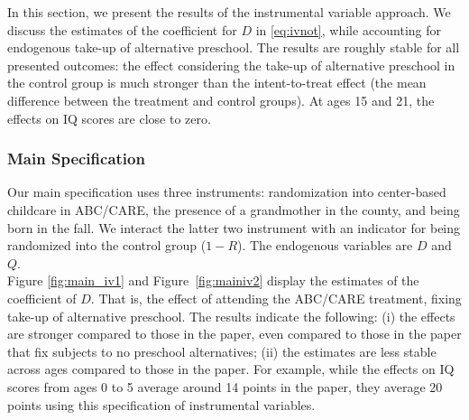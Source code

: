 \noindent In this section, we present the results of the instrumental variable approach. We discuss the estimates of the coefficient for $D$ in \eqref{eq:ivnot}, while accounting for endogenous take-up of alternative preschool. The results are roughly stable for all presented outcomes: the effect considering the take-up of alternative preschool in the control group is much stronger than the intent-to-treat effect (the mean difference between the treatment and control groups). At ages 15 and 21, the effects on IQ scores are close to zero.

\subsubsection{Main Specification}

\noindent Our main specification uses three instruments: randomization into center-based childcare in ABC/CARE, the presence of a grandmother in the county, and being born in the fall. We interact the latter two instrument with an indicator for being randomized into the control group ($1-R$). The endogenous variables are $D$ and $Q$.\\

\noindent Figure \ref{fig:main_iv1} and Figure~\ref{fig:mainiv2} display the estimates of the coefficient of $D$. That is, the effect of attending the ABC/CARE treatment, fixing take-up of alternative preschool. The results indicate the following: (i) the effects are stronger compared to those in the paper, even compared to those in the paper that fix subjects to no preschool alternatives; (ii) the estimates are less stable across ages compared to those in the paper. For example, while the effects on IQ scores from ages 0 to 5 average around 14 points in the paper, they average 20 points using this specification of instrumental variables.

